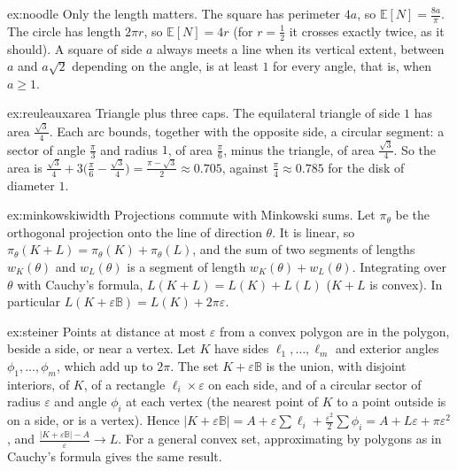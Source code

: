\begin{solution}{ex:noodle}
\idea Only the length matters.
\writeup The square has perimeter $4a$, so $\mathbb E[N]=\frac{8a}\pi$. The circle has length $2\pi r$, so $\mathbb E[N]=4r$ (for $r=\frac12$ it crosses exactly twice, as
it should). A square of side $a$ always meets a line when its vertical extent, between $a$ and $a\sqrt2$ depending on the angle, is at least $1$ for every angle,
that is, when $a\ge1$.
\end{solution}

\begin{solution}{ex:reuleauxarea}
\idea Triangle plus three caps.
\writeup The equilateral triangle of side $1$ has area $\frac{\sqrt3}4$. Each arc bounds, together with the opposite side, a circular segment: a sector of angle
$\frac\pi3$ and radius $1$, of area $\frac\pi6$, minus the triangle, of area $\frac{\sqrt3}4$. So the area is
$\frac{\sqrt3}4+3\bigl(\frac\pi6-\frac{\sqrt3}4\bigr)=\frac{\pi-\sqrt3}2\approx0.705$, against $\frac\pi4\approx0.785$ for the disk of diameter $1$.
\end{solution}

\begin{solution}{ex:minkowskiwidth}
\idea Projections commute with Minkowski sums.
\writeup Let $\pi_\theta$ be the orthogonal projection onto the line of direction $\theta$. It is linear, so $\pi_\theta(K+L)=\pi_\theta(K)+\pi_\theta(L)$, and the sum of two
segments of lengths $w_K(\theta)$ and $w_L(\theta)$ is a segment of length $w_K(\theta)+w_L(\theta)$. Integrating over $\theta$ with Cauchy's formula,
$L(K+L)=L(K)+L(L)$ ($K+L$ is convex). In particular $L(K+\varepsilon\mathbb B)=L(K)+2\pi\varepsilon$.
\end{solution}

\begin{solution}{ex:steiner}
\idea Points at distance at most $\varepsilon$ from a convex polygon are in the polygon, beside a side, or near a vertex.
\writeup Let $K$ have sides $\ell_1,\dots,\ell_m$ and exterior angles $\phi_1,\dots,\phi_m$, which add up to $2\pi$. The set $K+\varepsilon\mathbb B$ is the union, with
disjoint interiors, of $K$, of a rectangle $\ell_i\times\varepsilon$ on each side, and of a circular sector of radius $\varepsilon$ and angle $\phi_i$ at each vertex (the
nearest point of $K$ to a point outside is on a side, or is a vertex). Hence $|K+\varepsilon\mathbb B|=A+\varepsilon\sum\ell_i+\frac{\varepsilon^2}2\sum\phi_i=A+L\varepsilon+\pi\varepsilon^2$,
and $\frac{|K+\varepsilon\mathbb B|-A}\varepsilon\to L$. For a general convex set, approximating by polygons as in Cauchy's formula gives the same result.
\end{solution}

